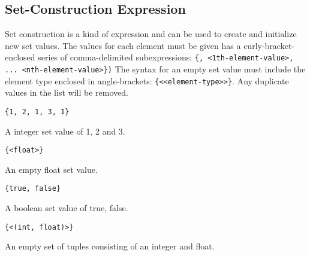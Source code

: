 
\subsection{Set-Construction Expression}
{
	Set construction is a kind of expression and can be
	used to create and initialize new set values.
	The values for each element must be given has a curly-bracket-enclosed
	series of comma-delimited
	subexpressions: \texttt{\{<0th-element-value>, <1th-element-value>, ... <nth-element-value>\})}
	The syntax for an empty set value must include the element type enclosed
	in angle-brackets: \texttt{\{<<element-type>>\}}.
	Any duplicate values in the list will be removed.
	
	\begin{itemize}
	{
		\item \texttt{\{1, 2, 1, 3, 1\}}
		
			A integer set value of 1, 2 and 3.
		
		\item \texttt{\{<float>\}}
		
			An empty float set value.
		
		\item \texttt{\{true, false\}}
		
			A boolean set value of true, false.
		
		\item \texttt{\{<(int, float)>\}}
		
			An empty set of tuples consisting
				of an integer and float.
	}
	\end{itemize}
}
